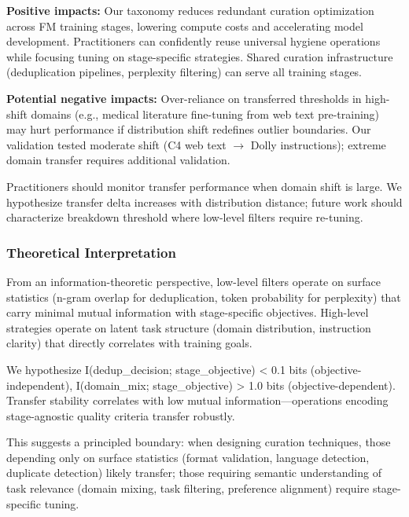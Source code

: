 \textbf{Positive impacts:} Our taxonomy reduces redundant curation optimization across FM training stages, lowering compute costs and accelerating model development. Practitioners can confidently reuse universal hygiene operations while focusing tuning on stage-specific strategies. Shared curation infrastructure (deduplication pipelines, perplexity filtering) can serve all training stages.

\textbf{Potential negative impacts:} Over-reliance on transferred thresholds in high-shift domains (e.g., medical literature fine-tuning from web text pre-training) may hurt performance if distribution shift redefines outlier boundaries. Our validation tested moderate shift (C4 web text $\rightarrow$ Dolly instructions); extreme domain transfer requires additional validation.

Practitioners should monitor transfer performance when domain shift is large. We hypothesize transfer delta increases with distribution distance; future work should characterize breakdown threshold where low-level filters require re-tuning.

\subsubsection{Theoretical Interpretation}

From an information-theoretic perspective, low-level filters operate on surface statistics (n-gram overlap for deduplication, token probability for perplexity) that carry minimal mutual information with stage-specific objectives. High-level strategies operate on latent task structure (domain distribution, instruction clarity) that directly correlates with training goals.

We hypothesize I(dedup\_decision; stage\_objective) < 0.1 bits (objective-independent), I(domain\_mix; stage\_objective) > 1.0 bits (objective-dependent). Transfer stability correlates with low mutual information---operations encoding stage-agnostic quality criteria transfer robustly.

This suggests a principled boundary: when designing curation techniques, those depending only on surface statistics (format validation, language detection, duplicate detection) likely transfer; those requiring semantic understanding of task relevance (domain mixing, task filtering, preference alignment) require stage-specific tuning.
